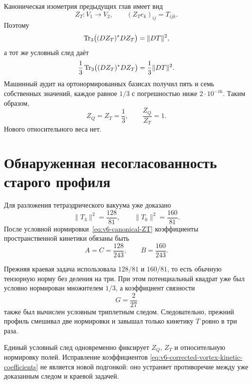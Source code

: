 Каноническая изометрия предыдущих глав имеет вид
\begin{equation}
 Z_T:V_1\longrightarrow V_2,
 \qquad
 (Z_Te_k)_{ij}=T_{ijk}.
\end{equation}
Поэтому
\begin{equation}
 \operatorname{Tr}_3\bigl((DZ_T)^*DZ_T\bigr)=\|DT\|^2,
\end{equation}
а тот же условный след даёт
\begin{equation}
 \frac13\operatorname{Tr}_3\bigl((DZ_T)^*DZ_T\bigr)
 =\frac13\|DT\|^2.
 \label{eq:v6-canonical-ZT}
\end{equation}
Машинный аудит на ортонормированных базисах получил пять и семь
собственных значений, каждое равное $1/3$ с погрешностью ниже
$2\cdot10^{-16}$. Таким образом,
\begin{equation}
 Z_Q=Z_T=\frac13,
 \qquad
 \frac{Z_Q}{Z_T}=1.
 \label{eq:v6-relative-QT-stiffness}
\end{equation}
Нового относительного веса нет.

\section{Обнаруженная несогласованность старого профиля}

Для разложения тетраэдрического вакуума уже доказано
\begin{equation}
 \|T_3\|^2=\frac{128}{81},
 \qquad
 \|T_0\|^2=\frac{160}{81}.
\end{equation}
После условной нормировки~\eqref{eq:v6-canonical-ZT} коэффициенты
пространственной кинетики обязаны быть
\begin{equation}
 A=C=\frac{128}{243},
 \qquad
 B=\frac{160}{243}.
 \label{eq:v6-corrected-vortex-kinetic-coefficients}
\end{equation}

Прежняя краевая задача использовала $128/81$ и $160/81$, то есть обычную
тензорную норму без деления на три. При этом потенциальный квадрат уже
был условно нормирован множителем $1/3$, а коэффициент связности
\begin{equation}
 G=\frac{2}{27}
\end{equation}
также был вычислен условным триплетным следом. Следовательно, прежний
профиль смешивал две нормировки и завышал только кинетику $T$ ровно в три
раза.

\begin{proposition}
Единый условный след одновременно фиксирует $Z_Q$, $Z_T$ и относительную
нормировку полей. Исправление коэффициентов
\eqref{eq:v6-corrected-vortex-kinetic-coefficients} не является новой
подгонкой: оно устраняет противоречие между уже доказанным следом и
краевой задачей.
\end{proposition}

